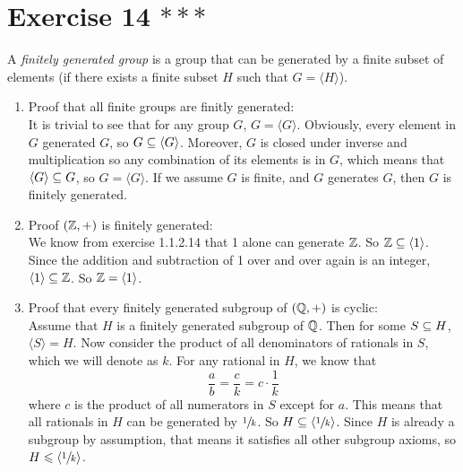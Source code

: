 \documentclass[12pt]{article}
\begin{document}
    \section*{Exercise 14 $***$}
    A \textit{finitely generated group} is a group that can be generated
    by a finite subset of elements
    (if there exists a finite subset $H$ such that $G = \langle H \rangle$).
    \begin{enumerate}[label=\textbf{\alph*.}]
        \item 
            Proof that all finite groups are finitly generated: \\
            It is trivial to see that for any group $G$,
            $G = \langle G \rangle$.
            Obviously, every element in $G$ generated $G$,
            so $G \subseteq \langle G \rangle$.
            Moreover, $G$ is closed under inverse and multiplication
            so any combination of its elements is in $G$,
            which means that $\langle G \rangle \subseteq G$,
            so $G = \langle G \rangle$.
            If we assume $G$ is finite,
            and $G$ generates $G$,
            then $G$ is finitely generated.
        \item 
            Proof $(\mathbb{Z}, +)$ is finitely generated: \\
            We know from exercise 1.1.2.14 that 1 alone can generate $\mathbb{Z}$.
            So $\mathbb{Z} \subseteq \langle 1 \rangle$.
            Since the addition and subtraction of 1 over and over again
            is an integer,
            $\langle 1 \rangle \subseteq \mathbb{Z}$.
            So $\mathbb{Z} = \langle 1 \rangle$.
        \item
            Proof that every finitely generated subgroup of $(\mathbb{Q}, +)$
            is cyclic: \\
            Assume that $H$ is a finitely generated subgroup of $\mathbb{Q}$.
            Then for some $S \subseteq H$,
            $\langle S \rangle = H$.
            Now consider the product of all denominators of rationals in $S$,
            which we will denote as $k$.
            For any rational in $H$,
            we know that 
            \[ \dfrac{a}{b} = \dfrac{c}{k} = c \cdot \dfrac{1}{k} \]
            where $c$ is the product of all numerators in $S$
            except for $a$.
            This means that all rationals in $H$
            can be generated by $\sfrac{1}{k}$.
            So $H \subseteq \langle \sfrac{1}{k} \rangle$.
            Since $H$ is already a subgroup by assumption,
            that means it satisfies all other subgroup axioms,
            so $H \leqslant \langle \sfrac{1}{k} \rangle$.

\end{enumerate}
\end{document}
